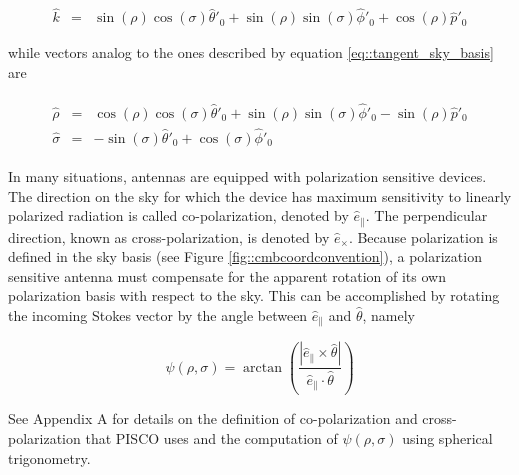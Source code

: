 \documentclass[a4paper,11pt]{article}
\newcommand{\co}{\mathbin{\|}}
\newcommand{\cx}{\mathbin{\times}}
\begin{document}
\begin{equation}
\begin{aligned}
\hat{k}       &=&  \sin(\rho)\cos(\sigma)\hat{\theta}'_0 + \sin(\rho)\sin(\sigma) \hat{\phi}'_0 + \cos(\rho) \hat{p}'_0 
\end{aligned}
\end{equation}

\noindent
while vectors analog to the ones described by equation \ref{eq::tangent_sky_basis} are

\begin{eqnarray}
\begin{aligned}
\hat{\rho}    &=&  \cos(\rho)\cos(\sigma)\hat{\theta}'_0 + \sin(\rho)\sin(\sigma) \hat{\phi}'_0 - \sin(\rho) \hat{p}'_0 \\
\hat{\sigma}  &=& -\sin(\sigma)\hat{\theta}'_0 + \cos(\sigma)\hat{\phi}'_0
\end{aligned}
\end{eqnarray}

In many situations, antennas are equipped with polarization sensitive devices. The direction on the sky for which the device has maximum sensitivity to linearly polarized radiation is called co-polarization, denoted by $\hat{e}_{\co}$. The perpendicular direction, known as cross-polarization, is denoted by $\hat{e}_{\cx}$.
Because polarization is defined in the sky basis (see Figure \ref{fig::cmbcoordconvention}), a polarization sensitive antenna must compensate for the apparent rotation of its own polarization basis with respect to the sky. This can be accomplished by rotating the incoming Stokes vector by the angle between $\hat{e}_{\co}$ and $\hat{\theta}$, namely

\begin{equation}
\psi(\rho,\sigma) = \arctan \left( \frac{ |\hat{e}_{\co} \times \hat{\theta}| }{ \hat{e}_{\co} \cdot \hat{\theta} } \right)
\label{eq::psi}
\end{equation}

See Appendix A for details on the definition of co-polarization and cross-polarization that PISCO uses and the computation of $\psi(\rho,\sigma)$ using spherical trigonometry.
\end{document}
